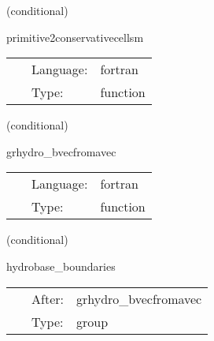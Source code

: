\vspace{5mm}

   (conditional) 

\hspace{5mm} primitive2conservativecellsm 

\hspace{5mm}{\it convert initial data given in primive variables to conserved variables - mhd version } 


\hspace{5mm}

 \begin{tabular*}{160mm}{cll} 
~ & Language:  & fortran \\ 
~ & Type:  & function \\ 
\end{tabular*} 


\vspace{5mm}

   (conditional) 

\hspace{5mm} grhydro\_bvecfromavec 

\hspace{5mm}{\it populate bvec from avec } 


\hspace{5mm}

 \begin{tabular*}{160mm}{cll} 
~ & Language:  & fortran \\ 
~ & Type:  & function \\ 
\end{tabular*} 


\vspace{5mm}

   (conditional) 

\hspace{5mm} hydrobase\_boundaries 

\hspace{5mm}{\it call boundary conditions after magnetic field initial data setup } 


\hspace{5mm}

 \begin{tabular*}{160mm}{cll} 
~ & After:  & grhydro\_bvecfromavec \\ 
~ & Type:  & group \\ 
\end{tabular*} 


